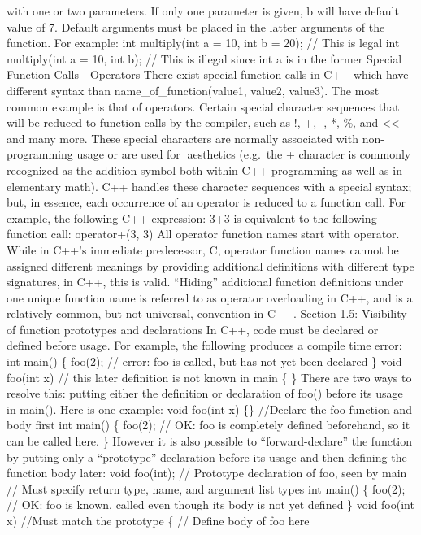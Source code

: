 with one or two parameters. If only one parameter is given, b will have
default value of 7. Default arguments must be placed in the latter
arguments of the function. For example: int multiply(int a = 10, int b =
20); // This is legal int multiply(int a = 10, int b); // This is
illegal since int a is in the former Special Function Calls - Operators
There exist special function calls in C++ which have diﬀerent syntax
than name\_of\_function(value1, value2, value3). The most common example
is that of operators. Certain special character sequences that will be
reduced to function calls by the compiler, such as !, +, -, *, \%, and
\textless\textless{} and many more. These special characters are
normally associated with non-programming usage or are used for
aesthetics (e.g.~the + character is commonly recognized as the addition
symbol both within C++ programming as well as in elementary math). C++
handles these character sequences with a special syntax; but, in
essence, each occurrence of an operator is reduced to a function call.
For example, the following C++ expression: 3+3 is equivalent to the
following function call: operator+(3, 3) All operator function names
start with operator. While in C++'s immediate predecessor, C, operator
function names cannot be assigned diﬀerent meanings by providing
additional deﬁnitions with diﬀerent type signatures, in C++, this is
valid. ``Hiding'' additional function deﬁnitions under one unique
function name is referred to as operator overloading in C++, and is a
relatively common, but not universal, convention in C++. Section 1.5:
Visibility of function prototypes and declarations In C++, code must be
declared or deﬁned before usage. For example, the following produces a
compile time error: int main() \{ foo(2); // error: foo is called, but
has not yet been declared \} void foo(int x) // this later definition is
not known in main \{ \} There are two ways to resolve this: putting
either the deﬁnition or declaration of foo() before its usage in main().
Here is one example: void foo(int x) \{\} //Declare the foo function and
body first int main() \{ foo(2); // OK: foo is completely defined
beforehand, so it can be called here. \} However it is also possible to
``forward-declare'' the function by putting only a ``prototype''
declaration before its usage and then deﬁning the function body later:
void foo(int); // Prototype declaration of foo, seen by main // Must
specify return type, name, and argument list types int main() \{ foo(2);
// OK: foo is known, called even though its body is not yet defined \}
void foo(int x) //Must match the prototype \{ // Define body of foo here
